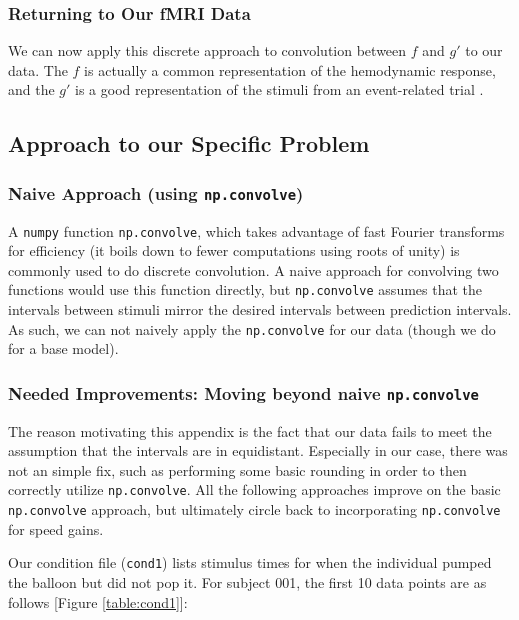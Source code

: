 \subsubsection{Returning to Our fMRI Data}

We can now apply this discrete approach to convolution between $f$ and $g'$ 
to our data. The $f$ is actually a common representation of the hemodynamic 
response, and the $g'$ is a good representation of the stimuli from an 
event-related trial \cite{brett2015course}. 

\subsection{Approach to our Specific Problem}

\subsubsection{Naive Approach (using \texttt{np.convolve})}

A \texttt{numpy} function \texttt{np.convolve}, which takes advantage of 
fast Fourier transforms for efficiency (it boils down to fewer computations 
using roots of unity) is commonly used to do discrete convolution. A naive 
approach for convolving two functions would use this function directly, but
\texttt{np.convolve} assumes that the intervals between stimuli mirror the 
desired intervals between prediction intervals. As such, we can not naively
apply the \texttt{np.convolve} for our data (though we do for a base model). 

\subsubsection{Needed Improvements: Moving beyond naive \texttt{np.convolve}}

The reason motivating this appendix is the fact that our data fails to meet the 
assumption that the intervals are in equidistant. Especially in our case, there 
was not an simple fix, such as performing some basic rounding in order to then 
correctly utilize \texttt{np.convolve}. All the following approaches improve on 
the basic \texttt{np.convolve} approach, but ultimately circle back to 
incorporating \texttt{np.convolve} for speed gains. 

Our condition file (\texttt{cond1}) lists stimulus times for when the 
individual pumped the balloon but did not pop it. For subject 001, the 
first 10 data points are as follows [Figure \ref{table:cond1}]:

